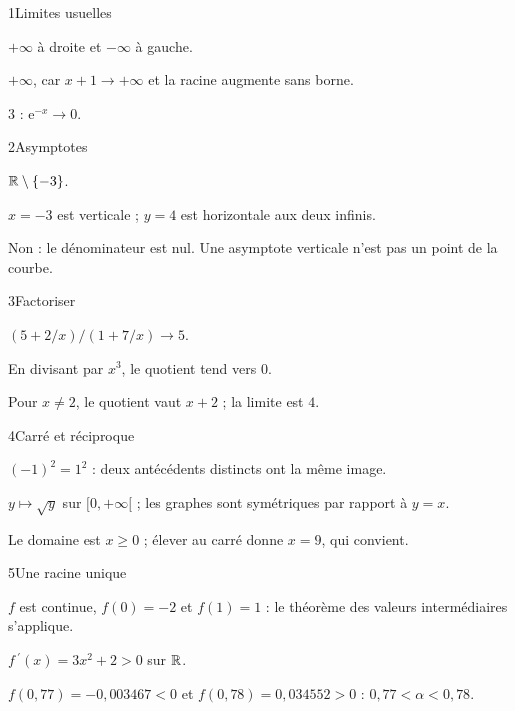 \begin{corrige}{1}{Limites usuelles}
\begin{questions}
\item $+\infty$ à droite et $-\infty$ à gauche.
\item $+\infty$, car $x+1\to+\infty$ et la racine augmente sans borne.
\item $3$ : $\mathrm e^{-x}\to0$.
\end{questions}
\end{corrige}
\begin{corrige}{2}{Asymptotes}
\begin{questions}
\item $\mathbb{R}\setminus\{-3\}$.
\item $x=-3$ est verticale ; $y=4$ est horizontale aux deux infinis.
\item Non : le dénominateur est nul. Une asymptote verticale n’est pas un point de la courbe.
\end{questions}
\end{corrige}
\begin{corrige}{3}{Factoriser}
\begin{questions}
\item $(5+2/x)/(1+7/x)\to5$.
\item En divisant par $x^3$, le quotient tend vers $0$.
\item Pour $x\ne2$, le quotient vaut $x+2$ ; la limite est $4$.
\end{questions}
\end{corrige}
\begin{corrige}{4}{Carré et réciproque}
\begin{questions}
\item $(-1)^2=1^2$ : deux antécédents distincts ont la même image.
\item $y\mapsto\sqrt y$ sur $[0,+\infty[$ ; les graphes sont symétriques par rapport à $y=x$.
\item Le domaine est $x\geq0$ ; élever au carré donne $x=9$, qui convient.
\end{questions}
\end{corrige}
\begin{corrige}{5}{Une racine unique}
\begin{questions}
\item $f$ est continue, $f(0)=-2$ et $f(1)=1$ : le théorème des valeurs intermédiaires s’applique.
\item $f\,\!^{\prime}(x)=3x^2+2>0$ sur $\mathbb{R}$.
\item $f(0{,}77)=-0{,}003467<0$ et $f(0{,}78)=0{,}034552>0$ : $0{,}77<\alpha<0{,}78$.
\end{questions}
\end{corrige}
